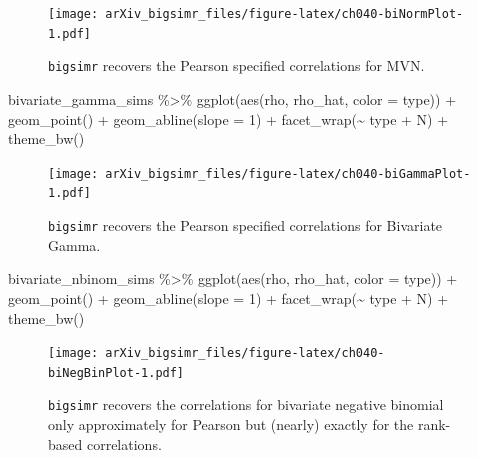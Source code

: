 \documentclass{article}
\newenvironment{Shaded}{\begin{snugshade}}{\end{snugshade}}
\newcommand{\AttributeTok}[1]{\textcolor[rgb]{0.77,0.63,0.00}{#1}}
\newcommand{\DecValTok}[1]{\textcolor[rgb]{0.00,0.00,0.81}{#1}}
\newcommand{\FunctionTok}[1]{\textcolor[rgb]{0.00,0.00,0.00}{#1}}
\newcommand{\NormalTok}[1]{#1}
\newcommand{\SpecialCharTok}[1]{\textcolor[rgb]{0.00,0.00,0.00}{#1}}
\begin{document}
\begin{figure}
\centering
\texttt{[image: arXiv\_bigsimr\_files/figure-latex/ch040-biNormPlot-1.pdf]}
\caption{\texttt{bigsimr} recovers the Pearson specified correlations
for MVN.}
\end{figure}

\begin{Shaded}
\begin{Highlighting}[]
\NormalTok{bivariate\_gamma\_sims }\SpecialCharTok{\%\textgreater{}\%}
    \FunctionTok{ggplot}\NormalTok{(}\FunctionTok{aes}\NormalTok{(rho, rho\_hat, }\AttributeTok{color =}\NormalTok{ type)) }\SpecialCharTok{+}
    \FunctionTok{geom\_point}\NormalTok{() }\SpecialCharTok{+}
    \FunctionTok{geom\_abline}\NormalTok{(}\AttributeTok{slope =} \DecValTok{1}\NormalTok{) }\SpecialCharTok{+}
    \FunctionTok{facet\_wrap}\NormalTok{(}\SpecialCharTok{\textasciitilde{}}\NormalTok{ type }\SpecialCharTok{+}\NormalTok{ N) }\SpecialCharTok{+} 
    \FunctionTok{theme\_bw}\NormalTok{()}
\end{Highlighting}
\end{Shaded}

\begin{figure}
\centering
\texttt{[image: arXiv\_bigsimr\_files/figure-latex/ch040-biGammaPlot-1.pdf]}
\caption{\texttt{bigsimr} recovers the Pearson specified correlations
for Bivariate Gamma.}
\end{figure}

\begin{Shaded}
\begin{Highlighting}[]
\NormalTok{bivariate\_nbinom\_sims }\SpecialCharTok{\%\textgreater{}\%}
    \FunctionTok{ggplot}\NormalTok{(}\FunctionTok{aes}\NormalTok{(rho, rho\_hat, }\AttributeTok{color =}\NormalTok{ type)) }\SpecialCharTok{+}
    \FunctionTok{geom\_point}\NormalTok{() }\SpecialCharTok{+}
    \FunctionTok{geom\_abline}\NormalTok{(}\AttributeTok{slope =} \DecValTok{1}\NormalTok{) }\SpecialCharTok{+}
    \FunctionTok{facet\_wrap}\NormalTok{(}\SpecialCharTok{\textasciitilde{}}\NormalTok{ type }\SpecialCharTok{+}\NormalTok{ N) }\SpecialCharTok{+} 
    \FunctionTok{theme\_bw}\NormalTok{()}
\end{Highlighting}
\end{Shaded}

\begin{figure}
\centering
\texttt{[image: arXiv\_bigsimr\_files/figure-latex/ch040-biNegBinPlot-1.pdf]}
\caption{\texttt{bigsimr} recovers the correlations for bivariate
negative binomial only approximately for Pearson but (nearly) exactly
for the rank-based correlations.}
\end{figure}
\end{document}
